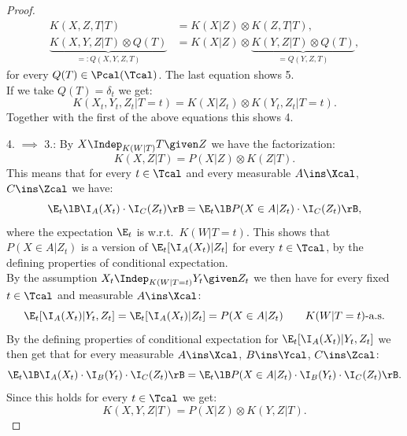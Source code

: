 \begin{Thm}
\begin{proof}
    \begin{align*}
        K(X,Z,T|T)            &= K(X|Z) \otimes K(Z,T|T),\\
        \underbrace{K(X,Y,Z|T)\otimes Q(T)}_{=:Q(X,Y,Z,T)} &= K(X|Z) \otimes \underbrace{K(Y,Z|T) \otimes Q(T)}_{=Q(Y,Z,T)},
    \end{align*}
    for every $Q(T) \in \Pcal(\Tcal)$. The last equation shows 5.\\ 
    If we take $Q(T)=\delta_t$ we get:
    \[K(X_t,Y_t,Z_t|T=t) = K(X|Z_t) \otimes K(Y_t,Z_t|T=t). \]
    Together with the first of the above equations this shows 4.\\

    4. $\implies$ 3.:  By $X \Indep_{K(W|T)} T \given Z$ we have the factorization:
    \[K(X,Z|T) = P(X|Z) \otimes K(Z|T).\]
    This means that for every $t \in \Tcal$ and every measurable $A \ins \Xcal$, $C \ins \Zcal$ we have:
    \[ \E_t\lB \I_A(X_t) \cdot \I_C(Z_t)\rB = \E_t\lB P(X \in A|Z_t) \cdot \I_C(Z_t)\rB,  \]
    where the expectation $\E_t$ is w.r.t.\ $K(W|T=t)$. This shows that $P(X \in A|Z_t)$ is a version of $\E_t[\I_A(X_t)|Z_t]$ for every $t \in \Tcal$, 
    by the defining properties of conditional expectation.\\
    By the assumption $ X_t \Indep_{K(W|T=t)} Y_t \given Z_t$ we then have for every fixed $t\in \Tcal$ and measurable $A \ins \Xcal$:
    \[ \E_t[\I_A(X_t)|Y_t,Z_t] = \E_t[\I_A(X_t)|Z_t] = P(X \in A|Z_t)\qquad K(W|T=t)\text{-a.s.}\]
    By the defining properties of conditional expectation for $\E_t[\I_A(X_t)|Y_t,Z_t]$  we then get that for every measurable  $A \ins \Xcal$, $B \ins \Ycal$, $C \ins \Zcal$:
    \[ \E_t\lB \I_A(X_t) \cdot \I_B(Y_t) \cdot \I_C(Z_t)\rB = \E_t\lB P(X \in A|Z_t) \cdot \I_B(Y_t) \cdot \I_C(Z_t)\rB. \]
    Since this holds for every $t \in \Tcal$ we get:
    \[ K(X,Y,Z|T) = P(X|Z) \otimes K(Y,Z|T).\]
\end{proof}
\end{Thm}
